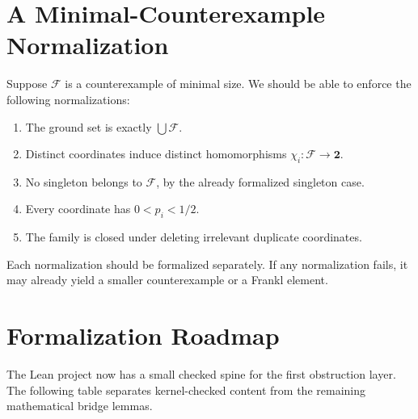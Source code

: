 \documentclass[11pt]{article}
\begin{document}
\section{A Minimal-Counterexample Normalization}

Suppose $\mathcal{F}$ is a counterexample of minimal size.  We should be able
to enforce the following normalizations:
\begin{enumerate}[label=(N\arabic*)]
  \item The ground set is exactly $\bigcup\mathcal{F}$.
  \item Distinct coordinates induce distinct homomorphisms
  $\chi_i:\mathcal{F}\to\mathbf{2}$.
  \item No singleton belongs to $\mathcal{F}$, by the already formalized
  singleton case.
  \item Every coordinate has $0<p_i<1/2$.
  \item The family is closed under deleting irrelevant duplicate coordinates.
\end{enumerate}
Each normalization should be formalized separately.  If any normalization
fails, it may already yield a smaller counterexample or a Frankl element.

\section{Formalization Roadmap}

The Lean project now has a small checked spine for the first obstruction
layer.  The following table separates kernel-checked content from the remaining
mathematical bridge lemmas.
\end{document}
